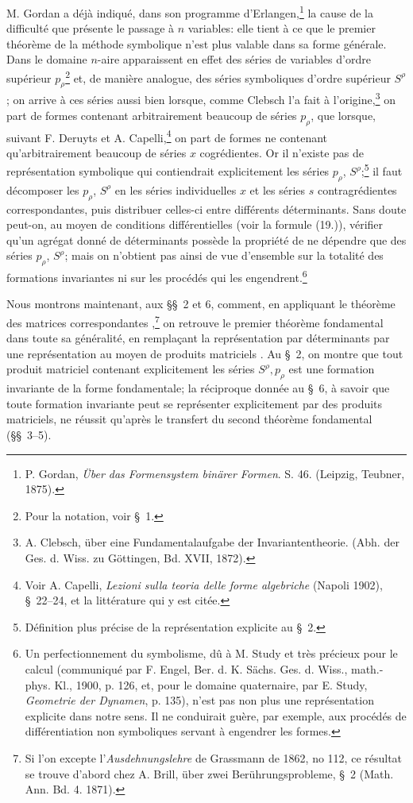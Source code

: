 \documentclass[11pt]{article}
\begin{document}
M. Gordan a déjà indiqué, dans son programme d'Erlangen,\footnote{P. Gordan, \emph{Über das Formensystem binärer Formen}. S. 46. (Leipzig, Teubner, 1875).} la cause de la difficulté que présente le passage à $n$ variables: elle tient à ce que le premier théorème de la méthode symbolique n'est plus valable dans sa forme générale. Dans le domaine $n$-aire apparaissent en effet des séries de variables d'ordre supérieur $p_\rho$\footnote{Pour la notation, voir \S\ 1.} et, de manière analogue, des séries symboliques d'ordre supérieur $S^\rho$; on arrive à ces séries aussi bien lorsque, comme Clebsch l'a fait à l'origine,\footnote{A. Clebsch, über eine Fundamentalaufgabe der Invariantentheorie. (Abh. der Ges. d. Wiss. zu Göttingen, Bd. XVII, 1872).} on part de formes contenant arbitrairement beaucoup de séries $p_\rho$, que lorsque, suivant F. Deruyts et A. Capelli,\footnote{Voir A. Capelli, \emph{Lezioni sulla teoria delle forme algebriche} (Napoli 1902), \S\ 22--24, et la littérature qui y est citée.} on part de formes ne contenant qu'arbitrairement beaucoup de séries $x$ cogrédientes. Or il n'existe pas de représentation symbolique qui contiendrait explicitement les séries $p_\rho$, $S^\rho$;\footnote{Définition plus précise de la \og représentation explicite \fg{} au \S\ 2.} il faut décomposer les $p_\rho$, $S^\rho$ en les séries individuelles $x$ et les séries $s$ contragrédientes correspondantes, puis distribuer celles-ci entre différents déterminants. Sans doute peut-on, au moyen de conditions différentielles (voir la formule (19.)), vérifier qu'un agrégat donné de déterminants possède la propriété de ne dépendre que des séries $p_\rho$, $S^\rho$; mais on n'obtient pas ainsi de vue d'ensemble sur la totalité des formations invariantes ni sur les procédés qui les engendrent.\footnote{Un perfectionnement du symbolisme, dû à M. Study et très précieux pour le calcul (communiqué par F. Engel, Ber. d. K. Sächs. Ges. d. Wiss., math.-phys. Kl., 1900, p. 126, et, pour le domaine quaternaire, par E. Study, \emph{Geometrie der Dynamen}, p. 135), n'est pas non plus une représentation explicite dans notre sens. Il ne conduirait guère, par exemple, aux procédés de différentiation non symboliques servant à engendrer les formes.}

Nous montrons maintenant, aux \S\S\ 2 et 6, comment, en appliquant le \og théorème des matrices correspondantes \fg{},\footnote{Si l'on excepte l'\emph{Ausdehnungslehre} de Grassmann de 1862, no 112, ce résultat se trouve d'abord chez A. Brill, über zwei Berührungsprobleme, \S\ 2 (Math. Ann. Bd. 4. 1871).} on retrouve le premier théorème fondamental dans toute sa généralité, en remplaçant la représentation par déterminants par une représentation au moyen de \og produits matriciels \fg{}. Au \S\ 2, on montre que tout produit matriciel contenant explicitement les séries $S^\rho,p_\rho$ est une formation invariante de la forme fondamentale; la réciproque donnée au \S\ 6, à savoir que toute formation invariante peut se représenter explicitement par des produits matriciels, ne réussit qu'après le transfert du second théorème fondamental (\S\S\ 3--5).
\end{document}
